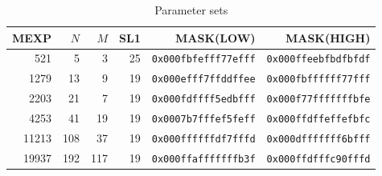 \documentclass{svmult}
\begin{document}
\begin{table}
  \begin{center}
    \caption{Parameter sets}
    \label{tab:params}
    \begin{tabular}{rrrrrr} \hline
      MEXP & $N$ & $M$ & SL1 & MASK(LOW) & MASK(HIGH) \\ \hline \hline
      521 & 5 & 3 & 25 & \texttt{0x000fbfefff77efff} 
      & \texttt{0x000ffeebfbdfbfdf} \\
      1279 & 13 & 9 & 19 & \texttt{0x000efff7ffddffee} 
      & \texttt{0x000fbffffff77fff} \\
      2203 & 21 & 7 & 19 & \texttt{0x000fdffff5edbfff} 
      & \texttt{0x000f77fffffffbfe} \\
      4253 & 41 & 19 & 19 & \texttt{0x0007b7fffef5feff} 
      & \texttt{0x000ffdffeffefbfc} \\
      11213 & 108 & 37 & 19 & \texttt{0x000ffffffdf7fffd} 
      & \texttt{0x000dfffffff6bfff} \\
      19937 & 192 & 117 & 19 & \texttt{0x000ffafffffffb3f} 
      & \texttt{0x000ffdfffc90fffd} \\ \hline
    \end{tabular}
  \end{center}
\end{table}


\end{document}

